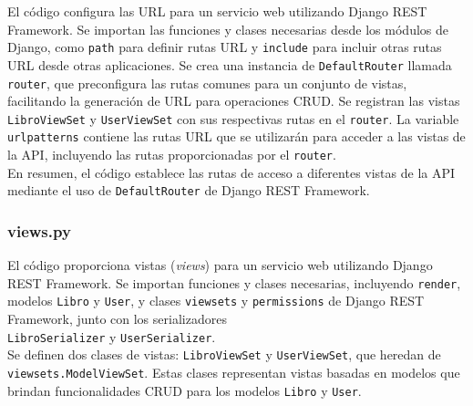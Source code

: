 \documentclass{article}
\begin{document}
	El código configura las URL para un servicio web utilizando Django REST Framework. Se importan las funciones y clases necesarias desde los módulos de Django, como \texttt{path} para definir rutas URL y \texttt{include} para incluir otras rutas URL desde otras aplicaciones. Se crea una instancia de \texttt{DefaultRouter} llamada \texttt{router}, que preconfigura las rutas comunes para un conjunto de vistas, facilitando la generación de URL para operaciones CRUD. Se registran las vistas \texttt{LibroViewSet} y \texttt{UserViewSet} con sus respectivas rutas en el \texttt{router}. La variable \texttt{urlpatterns} contiene las rutas URL que se utilizarán para acceder a las vistas de la API, incluyendo las rutas proporcionadas por el \texttt{router}.\\
	
	En resumen, el código establece las rutas de acceso a diferentes vistas de la API mediante el uso de \texttt{DefaultRouter} de Django REST Framework.
	
	
	
	
	
	\subsubsection{views.py}
	
	El código proporciona vistas (\textit{views}) para un servicio web utilizando Django REST Framework. Se importan funciones y clases necesarias, incluyendo \texttt{render}, modelos \texttt{Libro} y \texttt{User}, y clases \texttt{viewsets} y \texttt{permissions} de Django REST Framework, junto con los serializadores\\ \texttt{LibroSerializer} y \texttt{UserSerializer}.\\
	
	Se definen dos clases de vistas: \texttt{LibroViewSet} y \texttt{UserViewSet}, que heredan de\\ \texttt{viewsets.ModelViewSet}. Estas clases representan vistas basadas en modelos que brindan funcionalidades CRUD para los modelos \texttt{Libro} y \texttt{User}.\\
	
\end{document}
